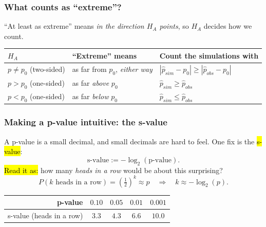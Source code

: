 \documentclass[slidestop,compress,mathserif]{beamer}
\begin{document}
\begin{frame}
\frametitle{What counts as ``extreme''?}

``At least as extreme'' means \emph{in the direction $H_A$ points}, so $H_A$ decides how we count.

\vspace{-0.1em}
{\footnotesize
\begin{center}
\begin{tabular}{lll}
\toprule
$H_A$ & ``Extreme'' means & Count the simulations with \\
\midrule
$p \neq p_0$ \; (two-sided) & as far from $p_0$, \emph{either way} & $|\widehat{p}_{sim}-p_0| \ge |\widehat{p}_{obs}-p_0|$ \\
$p > p_0$ \; (one-sided) & as far \emph{above} $p_0$ & $\widehat{p}_{sim} \ge \widehat{p}_{obs}$ \\
$p < p_0$ \; (one-sided) & as far \emph{below} $p_0$ & $\widehat{p}_{sim} \le \widehat{p}_{obs}$ \\
\bottomrule
\end{tabular}
\end{center}}

\vspace{-0.2em}

\end{frame}
\begin{frame}
\frametitle{Making a p-value intuitive: the s-value}

A p-value is a small decimal, and small decimals are hard to feel. One fix is the \hl{s-value}:
\[
\text{s-value} := -\log_2(\text{p-value}).
\]
\pause
\hl{Read it as:} how many \emph{heads in a row} would be about this surprising?
\[
P(k\text{ heads in a row}) = \left(\tfrac12\right)^{k} \approx p
\quad\Longrightarrow\quad
k \approx -\log_2(p).
\]
\pause
\vspace{-0.5em}
{\footnotesize
\begin{center}
\begin{tabular}{rcccc}
\toprule
p-value & $0.10$ & $0.05$ & $0.01$ & $0.001$ \\
\midrule
s-value (heads in a row) & $3.3$ & $4.3$ & $6.6$ & $10.0$ \\
\bottomrule
\end{tabular}
\end{center}}


\end{frame}
\end{document}
